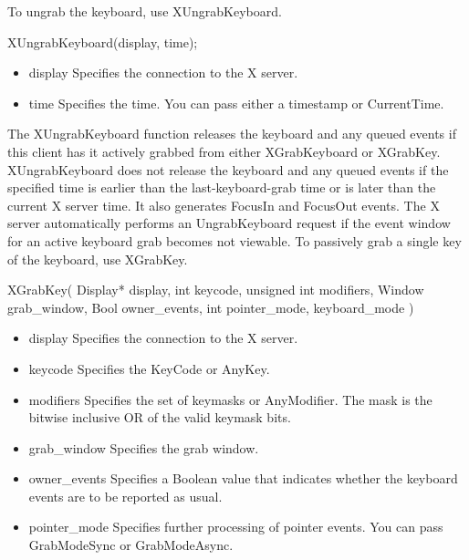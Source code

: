 \documentclass{report}
\begin{document}
\begin{itemize}
            To ungrab the keyboard, use XUngrabKeyboard.
            \bigbreak \noindent 
            \begin{cppcode}
            XUngrabKeyboard(display, time);
            \end{cppcode}
            \bigbreak \noindent
            \begin{itemize}
                \item display Specifies the connection to the X server.
                \item time Specifies the time. You can pass either a timestamp or CurrentTime.
            \end{itemize}
            \bigbreak \noindent 
            The XUngrabKeyboard function releases the keyboard and any queued events if this client has it actively grabbed from either XGrabKeyboard or XGrabKey. XUngrabKeyboard does not release the keyboard and any queued events if the specified time is earlier than the last-keyboard-grab time or is later than the current X server time. It also generates FocusIn and FocusOut events. The X server automatically performs an UngrabKeyboard request if the event window for an active keyboard grab becomes not viewable.
            \bigbreak \noindent 
            To passively grab a single key of the keyboard, use XGrabKey.
            \bigbreak \noindent 
            \begin{cppcode}
                XGrabKey(
                    Display* display,
                    int keycode,
                    unsigned int modifiers,
                    Window grab_window,
                    Bool owner_events,
                    int pointer_mode, keyboard_mode
                )
            \end{cppcode}
            \bigbreak \noindent
            \begin{itemize}
                \item display Specifies the connection to the X server.
                \item keycode Specifies the KeyCode or AnyKey.
                \item modifiers Specifies the set of keymasks or AnyModifier. The mask is the bitwise inclusive OR of the valid keymask bits.
                \item grab\_window Specifies the grab window.
                \item owner\_events Specifies a Boolean value that indicates whether the keyboard events are to be reported as usual.
                \item pointer\_mode Specifies further processing of pointer events. You can pass GrabModeSync or GrabModeAsync.

\end{itemize}
\end{itemize}
\end{document}
